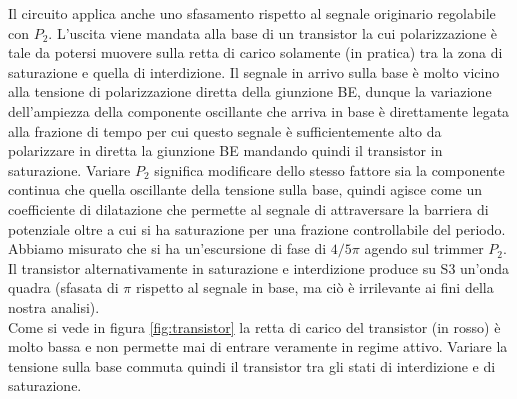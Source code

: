 \documentclass[10pt,a4paper]{article}
\begin{document}
Il circuito applica anche uno sfasamento rispetto al segnale originario regolabile con $P_2$. L'uscita viene mandata alla base di un transistor la cui polarizzazione è tale da potersi muovere sulla retta di carico solamente (in pratica) tra la zona di saturazione e quella di interdizione. Il segnale in arrivo sulla base è molto vicino alla tensione di polarizzazione diretta della giunzione BE, dunque la variazione dell'ampiezza della componente oscillante che arriva in base è direttamente legata alla frazione di tempo per cui questo segnale è sufficientemente alto da polarizzare in diretta la giunzione BE mandando quindi il transistor in saturazione. Variare $P_2$ significa modificare dello stesso fattore sia la componente continua che quella oscillante della tensione sulla base, quindi agisce come un coefficiente di dilatazione che permette al segnale di attraversare la barriera di potenziale oltre a cui si ha saturazione per una frazione controllabile del periodo. Abbiamo misurato che si ha un'escursione di fase di $4/5 \pi$ agendo sul trimmer $P_2$.
Il transistor alternativamente in saturazione e interdizione produce su S3 un'onda quadra (sfasata di $\pi$ rispetto al segnale in base, ma ciò è irrilevante ai fini della nostra analisi).\\



Come si vede in figura \ref{fig:transistor} la retta di carico del transistor (in rosso) è molto bassa e non permette mai di entrare veramente in regime attivo. Variare la tensione sulla base commuta quindi il transistor tra gli stati di interdizione e di saturazione.\\


 
\end{document}
